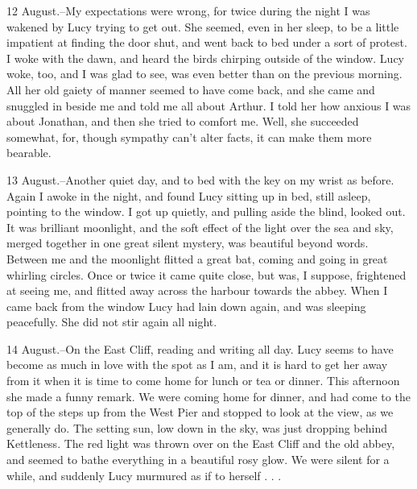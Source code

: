 12 August.--My expectations were wrong, for twice during the night I was wakened by Lucy trying to get out. She seemed, even in her sleep, to be a little impatient at finding the door shut, and went back to bed under a sort of protest. I woke with the dawn, and heard the birds chirping outside of the window. Lucy woke, too, and I was glad to see, was even better than on the previous morning. All her old gaiety of manner seemed to have come back, and she came and snuggled in beside me and told me all about Arthur. I told her how anxious I was about Jonathan, and then she tried to comfort me. Well, she succeeded somewhat, for, though sympathy can't alter facts, it can make them more bearable. 

13 August.--Another quiet day, and to bed with the key on my wrist as before. Again I awoke in the night, and found Lucy sitting up in bed, still asleep, pointing to the window. I got up quietly, and pulling aside the blind, looked out. It was brilliant moonlight, and the soft effect of the light over the sea and sky, merged together in one great silent mystery, was beautiful beyond words. Between me and the moonlight flitted a great bat, coming and going in great whirling circles. Once or twice it came quite close, but was, I suppose, frightened at seeing me, and flitted away across the harbour towards the abbey. When I came back from the window Lucy had lain down again, and was sleeping peacefully. She did not stir again all night. 

14 August.--On the East Cliff, reading and writing all day. Lucy seems to have become as much in love with the spot as I am, and it is hard to get her away from it when it is time to come home for lunch or tea or dinner. This afternoon she made a funny remark. We were coming home for dinner, and had come to the top of the steps up from the West Pier and stopped to look at the view, as we generally do. The setting sun, low down in the sky, was just dropping behind Kettleness. The red light was thrown over on the East Cliff and the old abbey, and seemed to bathe everything in a beautiful rosy glow. We were silent for a while, and suddenly Lucy murmured as if to herself . . . 

